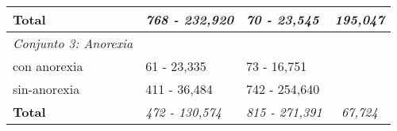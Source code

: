 \begin{table}[!hbt]
\begin{center}
\begin{tabular}{llll}
\rowcolor[HTML]{FFFFFF} 
\textbf{Total}                                              & \textit{768 - 232,920}                       & \textit{70 - 23,545}                         & \multicolumn{1}{c}{\cellcolor[HTML]{FFFFFF}\textit{195,047}}    \\ \hline
\rowcolor[HTML]{EFEFEF} 
\textit{Conjunto 3: Anorexia}                               & \multicolumn{1}{c}{\cellcolor[HTML]{EFEFEF}} & \multicolumn{1}{c}{\cellcolor[HTML]{EFEFEF}} &                                                              \\ \hline
\rowcolor[HTML]{FFFFFF} 
con anorexia                                                & 61 - 23,335                                  & 73 - 16,751                                  &                                                              \\ \hline
\rowcolor[HTML]{FFFFFF} 
sin-anorexia                                                & 411 - 36,484                                 & 742 - 254,640                                &                                                              \\ \hline
\rowcolor[HTML]{FFFFFF} 
\textbf{Total}                                              & \textit{472 - 130,574}                       & \textit{815 - 271,391}                       & \multicolumn{1}{c}{\cellcolor[HTML]{FFFFFF}\textit{67,724}}  \\ \hline
\end{tabular}

\end{center}

\end{table}
